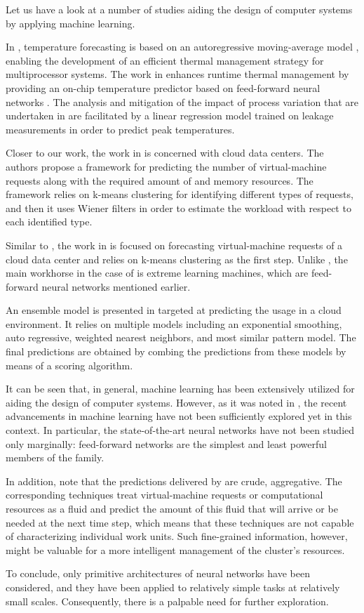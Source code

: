 Let us have a look at a number of studies aiding the design of computer systems
by applying machine learning.

In \cite{coskun2008}, temperature forecasting is based on an autoregressive
moving-average model \cite{hastie2009}, enabling the development of an efficient
thermal management strategy for multiprocessor systems. The work in
\cite{kumar2010} enhances runtime thermal management by providing an on-chip
temperature predictor based on feed-forward neural networks \cite{hastie2009}.
The analysis and mitigation of the impact of process variation that are
undertaken in \cite{juan2014} are facilitated by a linear regression model
\cite{hastie2009} trained on leakage measurements in order to predict peak
temperatures.

Closer to our work, the work in \cite{dabbagh2015} is concerned with cloud data
centers. The authors propose a framework for predicting the number of
virtual-machine requests along with the required amount of  and memory
resources. The framework relies on k-means clustering \cite{hastie2009} for
identifying different types of requests, and then it uses Wiener filters in
order to estimate the workload with respect to each identified type.

Similar to \cite{dabbagh2015}, the work in \cite{ismaeel2015} is focused on
forecasting virtual-machine requests of a cloud data center and relies on
k-means clustering as the first step. Unlike \cite{dabbagh2015}, the main
workhorse in the case of \cite{ismaeel2015} is extreme learning machines, which
are feed-forward neural networks mentioned earlier.

An ensemble model \cite{hastie2009} is presented in \cite{cao2014} targeted at
predicting the  usage in a cloud environment. It relies on multiple
models including an exponential smoothing, auto regressive, weighted nearest
neighbors, and most similar pattern model. The final predictions are obtained by
combing the predictions from these models by means of a scoring algorithm.

It can be seen that, in general, machine learning has been extensively utilized
for aiding the design of computer systems. However, as it was noted in
, the recent advancements in machine learning have not been
sufficiently explored yet in this context. In particular, the state-of-the-art
neural networks have not been studied only marginally: feed-forward networks are
the simplest and least powerful members of the family.

In addition, note that the predictions delivered by \cite{dabbagh2015,
ismaeel2015, cao2014} are crude, aggregative. The corresponding techniques treat
virtual-machine requests or computational resources as a fluid and predict the
amount of this fluid that will arrive or be needed at the next time step, which
means that these techniques are not capable of characterizing individual work
units. Such fine-grained information, however, might be valuable for a more
intelligent management of the cluster's resources.

To conclude, only primitive architectures of neural networks have been
considered, and they have been applied to relatively simple tasks at relatively
small scales. Consequently, there is a palpable need for further exploration.
